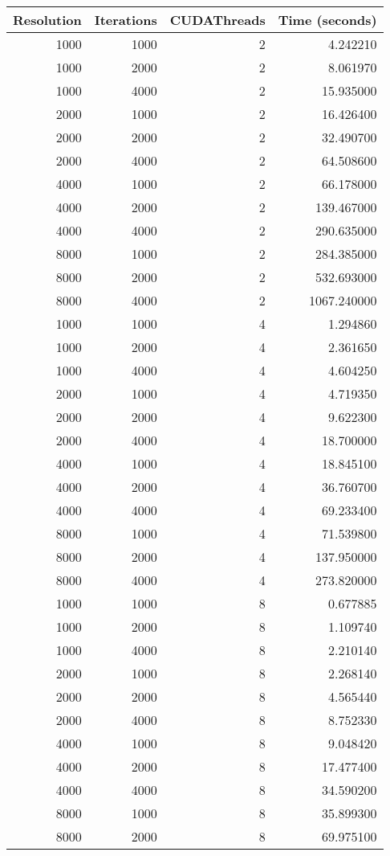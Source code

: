 \begin{tabular}{rrrr}
\toprule
Resolution & Iterations & CUDAThreads & Time (seconds) \\
\midrule
1000 & 1000 & 2 & 4.242210 \\
1000 & 2000 & 2 & 8.061970 \\
1000 & 4000 & 2 & 15.935000 \\
2000 & 1000 & 2 & 16.426400 \\
2000 & 2000 & 2 & 32.490700 \\
2000 & 4000 & 2 & 64.508600 \\
4000 & 1000 & 2 & 66.178000 \\
4000 & 2000 & 2 & 139.467000 \\
4000 & 4000 & 2 & 290.635000 \\
8000 & 1000 & 2 & 284.385000 \\
8000 & 2000 & 2 & 532.693000 \\
8000 & 4000 & 2 & 1067.240000 \\
1000 & 1000 & 4 & 1.294860 \\
1000 & 2000 & 4 & 2.361650 \\
1000 & 4000 & 4 & 4.604250 \\
2000 & 1000 & 4 & 4.719350 \\
2000 & 2000 & 4 & 9.622300 \\
2000 & 4000 & 4 & 18.700000 \\
4000 & 1000 & 4 & 18.845100 \\
4000 & 2000 & 4 & 36.760700 \\
4000 & 4000 & 4 & 69.233400 \\
8000 & 1000 & 4 & 71.539800 \\
8000 & 2000 & 4 & 137.950000 \\
8000 & 4000 & 4 & 273.820000 \\
1000 & 1000 & 8 & 0.677885 \\
1000 & 2000 & 8 & 1.109740 \\
1000 & 4000 & 8 & 2.210140 \\
2000 & 1000 & 8 & 2.268140 \\
2000 & 2000 & 8 & 4.565440 \\
2000 & 4000 & 8 & 8.752330 \\
4000 & 1000 & 8 & 9.048420 \\
4000 & 2000 & 8 & 17.477400 \\
4000 & 4000 & 8 & 34.590200 \\
8000 & 1000 & 8 & 35.899300 \\
8000 & 2000 & 8 & 69.975100 \\

\end{tabular}
